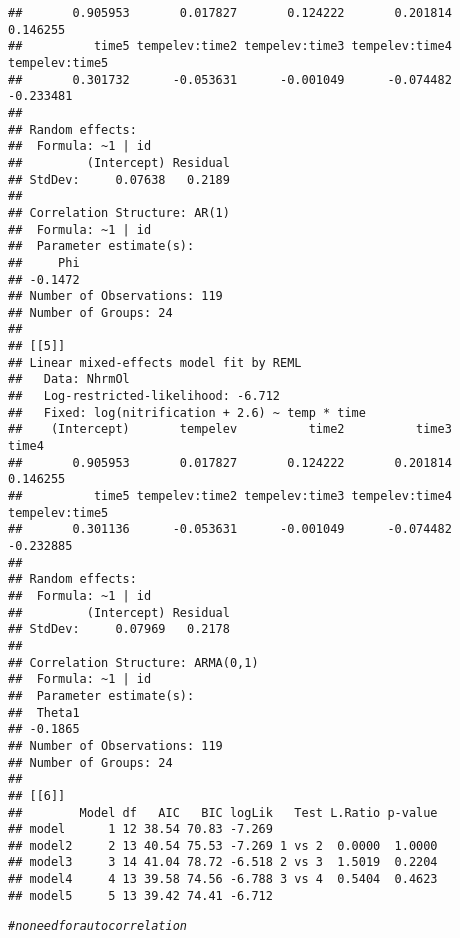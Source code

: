 \documentclass[11pt]{article}\usepackage[]{graphicx}\usepackage[]{color}
\makeatletter
\newcommand{\hlcom}[1]{\textcolor[rgb]{0.678,0.584,0.686}{\textit{#1}}}%
\newenvironment{kframe}{%
 \def\at@end@of@kframe{}%
 \ifinner\ifhmode%
  \def\at@end@of@kframe{\end{minipage}}%
  \begin{minipage}{\columnwidth}%
 \fi\fi%
 \def\FrameCommand##1{\hskip\@totalleftmargin \hskip-\fboxsep
 \colorbox{shadecolor}{##1}\hskip-\fboxsep
     \hskip-\linewidth \hskip-\@totalleftmargin \hskip\columnwidth}%
 \MakeFramed {\advance\hsize-\width
   \@totalleftmargin\z@ \linewidth\hsize
   \@setminipage}}%
 {\par\unskip\endMakeFramed%
 \at@end@of@kframe}
\newenvironment{knitrout}{}{} %
\makeatother
\begin{document}
\begin{knitrout}
\begin{kframe}
\begin{verbatim}
##       0.905953       0.017827       0.124222       0.201814       0.146255 
##          time5 tempelev:time2 tempelev:time3 tempelev:time4 tempelev:time5 
##       0.301732      -0.053631      -0.001049      -0.074482      -0.233481 
## 
## Random effects:
##  Formula: ~1 | id
##         (Intercept) Residual
## StdDev:     0.07638   0.2189
## 
## Correlation Structure: AR(1)
##  Formula: ~1 | id 
##  Parameter estimate(s):
##     Phi 
## -0.1472 
## Number of Observations: 119
## Number of Groups: 24 
## 
## [[5]]
## Linear mixed-effects model fit by REML
##   Data: NhrmOl 
##   Log-restricted-likelihood: -6.712
##   Fixed: log(nitrification + 2.6) ~ temp * time 
##    (Intercept)       tempelev          time2          time3          time4 
##       0.905953       0.017827       0.124222       0.201814       0.146255 
##          time5 tempelev:time2 tempelev:time3 tempelev:time4 tempelev:time5 
##       0.301136      -0.053631      -0.001049      -0.074482      -0.232885 
## 
## Random effects:
##  Formula: ~1 | id
##         (Intercept) Residual
## StdDev:     0.07969   0.2178
## 
## Correlation Structure: ARMA(0,1)
##  Formula: ~1 | id 
##  Parameter estimate(s):
##  Theta1 
## -0.1865 
## Number of Observations: 119
## Number of Groups: 24 
## 
## [[6]]
##        Model df   AIC   BIC logLik   Test L.Ratio p-value
## model      1 12 38.54 70.83 -7.269                       
## model2     2 13 40.54 75.53 -7.269 1 vs 2  0.0000  1.0000
## model3     3 14 41.04 78.72 -6.518 2 vs 3  1.5019  0.2204
## model4     4 13 39.58 74.56 -6.788 3 vs 4  0.5404  0.4623
## model5     5 13 39.42 74.41 -6.712
\end{verbatim}
\begin{alltt}
\hlcom{# no need for autocorrelation}


\end{alltt}
\end{kframe}
\end{knitrout}
\end{document}
